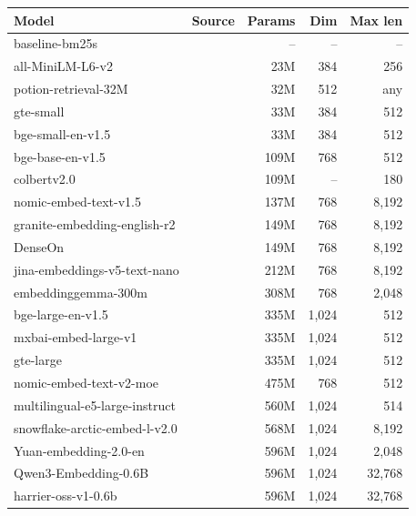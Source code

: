 \begin{table}[t]
\centering\footnotesize
\setlength{\tabcolsep}{5pt}
\begin{tabular}{@{}llrrr@{}}
\toprule
\textbf{Model} & \textbf{Source} & \textbf{Params} & \textbf{Dim} & \textbf{Max len} \\
\midrule
baseline-bm25s & \citealp{lu2024bm25s} & -- & -- & -- \\
all-MiniLM-L6-v2 & \citealp{reimers2019sbert,wang2020minilm} & 23M & 384 & 256 \\
potion-retrieval-32M & \citealp{tulkens2024model2vec} & 32M & 512 & any \\
gte-small & \citealp{li2023gte} & 33M & 384 & 512 \\
bge-small-en-v1.5 & \citealp{xiao2024cpack} & 33M & 384 & 512 \\
bge-base-en-v1.5 & \citealp{xiao2024cpack} & 109M & 768 & 512 \\
colbertv2.0 & \citealp{santhanam2022colbertv2} & 109M & -- & 180 \\
nomic-embed-text-v1.5 & \citealp{nussbaum2025nomic} & 137M & 768 & 8,192 \\
granite-embedding-english-r2 & \citealp{awasthy2025granite} & 149M & 768 & 8,192 \\
DenseOn & \citealp{sourty2026denseon} & 149M & 768 & 8,192 \\
jina-embeddings-v5-text-nano & \citealp{akram2026jinav5} & 212M & 768 & 8,192 \\
embeddinggemma-300m & \citealp{vera2025embeddinggemma} & 308M & 768 & 2,048 \\
bge-large-en-v1.5 & \citealp{xiao2024cpack} & 335M & 1,024 & 512 \\
mxbai-embed-large-v1 & \citealp{lee2024mxbai,li2024angle} & 335M & 1,024 & 512 \\
gte-large & \citealp{li2023gte} & 335M & 1,024 & 512 \\
nomic-embed-text-v2-moe & \citealp{nussbaum2025moe} & 475M & 768 & 512 \\
multilingual-e5-large-instruct & \citealp{wang2024multilinguale5} & 560M & 1,024 & 514 \\
snowflake-arctic-embed-l-v2.0 & \citealp{yu2024arcticembed2} & 568M & 1,024 & 8,192 \\
Yuan-embedding-2.0-en & \citealp{ieityuan2025yuanembedding} & 596M & 1,024 & 2,048 \\
Qwen3-Embedding-0.6B & \citealp{zhang2025qwen3embedding} & 596M & 1,024 & 32,768 \\
harrier-oss-v1-0.6b & \citealp{microsoft2026harrier} & 596M & 1,024 & 32,768 \\

\end{tabular}
\end{table}
